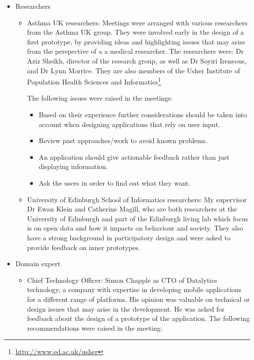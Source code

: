 \begin{itemize}
	\item Researchers 
    \begin{itemize}
      \item Asthma UK researchers: Meetings were arranged with various researchers from the Asthma UK group. They were involved early in the design of a first prototype, by providing ideas and highlighting issues that may arise from the perspective of a a medical researcher. The researchers were:  Dr Aziz Sheikh, director of the research group, as well as Dr Soyiri Ireneous, and Dr Lynn Morrice. They are also members of the Usher Institute of Population Health Sciences and Informatics\footnote{\url{http://www.ed.ac.uk/usher}}
      
    The following issues were raised in the meetings:
      \begin{itemize}
          \item Based on their experience further considerations should be taken into account when designing applications that rely on user input.
          \item Review past approaches/work to avoid known problems.
          \item An application should give actionable feedback rather than just displaying information.
          \item Ask the users in order to find out what they want.
      \end{itemize}
      \item University of Edinburgh School of Informatics researchers: My supervisor Dr Ewan Klein and Catherine Magill, who are both researchers at the University of Edinburgh and part of the Edinburgh living lab which focus is on open data and how it impacts on behaviour and society. They also have a strong background in participatory design and were asked to provide feedback on inner prototypes.
	\end{itemize}
	\item Domain expert  
   \begin{itemize}
      \item Chief Technology Officer: Simon Chapple as CTO of Datalytics technology, a company with expertise in developing mobile applications for a different range of platforms. His opinion was valuable on technical or design issues that may arise in the development. He was asked for feedback about the design of a prototype of the application.
    The following recommendations were raised in the meeting:
    \begin{itemize}

\end{itemize}
\end{itemize}
\end{itemize}
